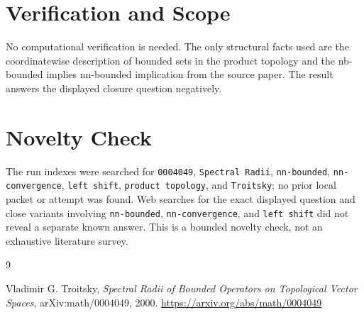 \documentclass[11pt]{article}
\begin{document}
\section*{Verification and Scope}

No computational verification is needed. The only structural facts used
are the coordinatewise description of bounded sets in the product
topology and the nb-bounded implies nn-bounded implication from the source
paper. The result answers the displayed closure question negatively.

\section*{Novelty Check}

The run indexes were searched for \texttt{0004049}, \texttt{Spectral
Radii}, \texttt{nn-bounded}, \texttt{nn-convergence}, \texttt{left
shift}, \texttt{product topology}, and \texttt{Troitsky}; no prior local
packet or attempt was found. Web searches for the exact displayed
question and close variants involving \texttt{nn-bounded},
\texttt{nn-convergence}, and \texttt{left shift} did not reveal a
separate known answer. This is a bounded novelty check, not an exhaustive
literature survey.

\begin{thebibliography}{9}

Vladimir G. Troitsky,
\emph{Spectral Radii of Bounded Operators on Topological Vector Spaces},
arXiv:math/0004049, 2000.
\url{https://arxiv.org/abs/math/0004049}

\end{thebibliography}
\end{document}
